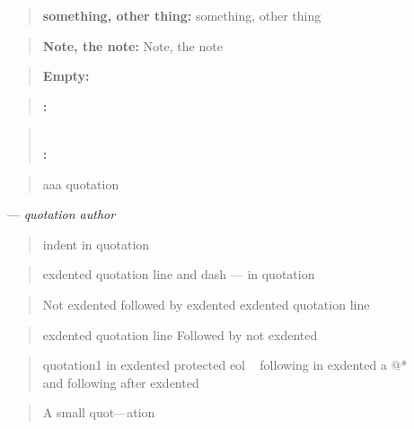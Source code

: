 \documentclass{book}
\begin{document}
\begin{titlepage}
\begin{quote}
\textbf{something, other thing:} something, other thing
\end{quote}

\begin{quote}
\textbf{Note, the note:} Note, the note
\end{quote}

\begin{quote}
\end{quote}

\begin{quote}
\textbf{Empty:} \end{quote}

\begin{quote}
\textbf{:} \end{quote}

\begin{quote}
\textbf{\leavevmode{}\\:} \end{quote}

\begin{quote}
aaa quotation
\end{quote}
\begin{center}
--- \emph{quotation author}
\end{center}

\begin{quote}
indent in quotation
\end{quote}

\begin{quote}
exdented quotation line   and dash --- in quotation
\end{quote}

\begin{quote}
Not exdented followed by exdented
exdented quotation line
\end{quote}

\begin{quote}
exdented quotation line
Followed by not exdented 
\end{quote}

\begin{quote}
quotation1
in exdented protected eol \ {}
following
in exdented a @* \leavevmode{}\\ and following
after exdented
\end{quote}

\begin{quote}
\begin{footnotesize}
A small quot---ation
\end{footnotesize}
\end{quote}


\end{titlepage}
\end{document}
